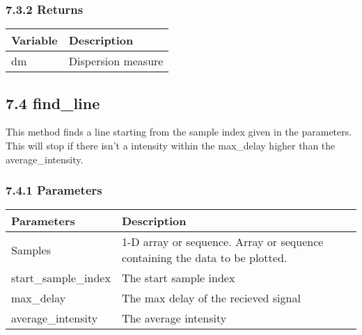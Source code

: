 \documentclass[]{article}
\begin{document}
\subsubsection{7.3.2 Returns}\label{returns-2}

\begin{longtable}[]{@{}ll@{}}
\toprule
Variable & Description\tabularnewline
\midrule
\endhead
dm & Dispersion measure\tabularnewline
\bottomrule
\end{longtable}

\subsection{7.4 find\_line}\label{find_line}

This method finds a line starting from the sample index given in the
parameters. This will stop if there isn't a intensity within the
max\_delay higher than the average\_intensity.

\subsubsection{7.4.1 Parameters}\label{parameters-5}

\begin{longtable}[]{@{}ll@{}}
\toprule
\begin{minipage}[b]{0.41\columnwidth}\raggedright\strut
Parameters\strut
\end{minipage} & \begin{minipage}[b]{0.41\columnwidth}\raggedright\strut
Description\strut
\end{minipage}\tabularnewline
\midrule
\endhead
\begin{minipage}[t]{0.41\columnwidth}\raggedright\strut
Samples\strut
\end{minipage} & \begin{minipage}[t]{0.41\columnwidth}\raggedright\strut
1-D array or sequence. Array or sequence containing the data to be
plotted.\strut
\end{minipage}\tabularnewline
\begin{minipage}[t]{0.41\columnwidth}\raggedright\strut
start\_sample\_index\strut
\end{minipage} & \begin{minipage}[t]{0.41\columnwidth}\raggedright\strut
The start sample index\strut
\end{minipage}\tabularnewline
\begin{minipage}[t]{0.41\columnwidth}\raggedright\strut
max\_delay\strut
\end{minipage} & \begin{minipage}[t]{0.41\columnwidth}\raggedright\strut
The max delay of the recieved signal\strut
\end{minipage}\tabularnewline
\begin{minipage}[t]{0.41\columnwidth}\raggedright\strut
average\_intensity\strut
\end{minipage} & \begin{minipage}[t]{0.41\columnwidth}\raggedright\strut
The average intensity\strut
\end{minipage}\tabularnewline
\bottomrule
\end{longtable}
\end{document}
